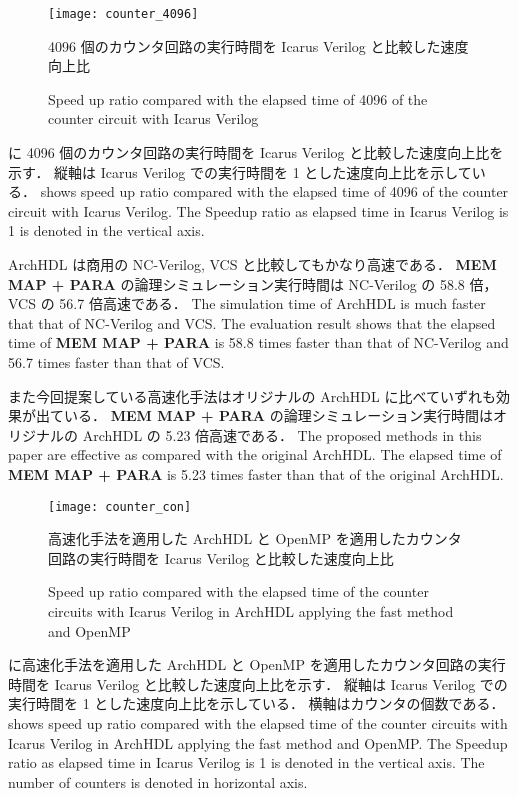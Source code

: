 \begin{figure}[tb]
 \centering
 \texttt{[image: counter\_4096]}
 \caption{4096 個のカウンタ回路の実行時間を Icarus Verilog と比較した速度向上比}
\fi
 \caption{Speed up ratio compared with the elapsed time of 4096 of the counter circuit with Icarus Verilog}
 \label{fig:counter4096}
\end{figure}

 に 4096 個のカウンタ回路の実行時間を Icarus Verilog と比較した速度向上比を示す．
縦軸は Icarus Verilog での実行時間を 1 とした速度向上比を示している．
\fi
{} shows speed up ratio compared with the elapsed time of 4096 of the counter circuit with Icarus Verilog.
The Speedup ratio as elapsed time in Icarus Verilog is 1 is denoted in the vertical axis.

ArchHDL は商用の NC-Verilog, VCS と比較してもかなり高速である．
\textbf{MEM MAP + PARA} の論理シミュレーション実行時間は NC-Verilog の 58.8 倍，VCS の 56.7 倍高速である．
\fi
The simulation time of ArchHDL is much faster that that of NC-Verilog and VCS.
The evaluation result shows that the elapsed time of \textbf{MEM MAP + PARA} is 58.8 times faster than that of NC-Verilog and 56.7 times faster than that of VCS.

また今回提案している高速化手法はオリジナルの ArchHDL に比べていずれも効果が出ている．
\textbf{MEM MAP + PARA} の論理シミュレーション実行時間はオリジナルの ArchHDL の 5.23 倍高速である．
\fi
The proposed methods in this paper are effective as compared with the original ArchHDL.
The elapsed time of \textbf{MEM MAP + PARA} is 5.23 times faster than that of the original ArchHDL.



\begin{figure}[tb]
 \centering
 \texttt{[image: counter\_con]}
 \caption{高速化手法を適用した ArchHDL と OpenMP を適用したカウンタ回路の実行時間を Icarus Verilog と比較した速度向上比}
\fi
 \caption{Speed up ratio compared with the elapsed time of the counter circuits with Icarus Verilog in ArchHDL applying the fast method and OpenMP}
 \label{fig:counter_con}
\end{figure}

 に高速化手法を適用した ArchHDL と OpenMP を適用したカウンタ回路の実行時間を Icarus Verilog と比較した速度向上比を示す．
縦軸は Icarus Verilog での実行時間を 1 とした速度向上比を示している．
横軸はカウンタの個数である．
\fi
{} shows speed up ratio compared with the elapsed time of the counter circuits with Icarus Verilog in ArchHDL applying the fast method and OpenMP.
The Speedup ratio as elapsed time in Icarus Verilog is 1 is denoted in the vertical axis.
The number of counters is denoted in horizontal axis.

